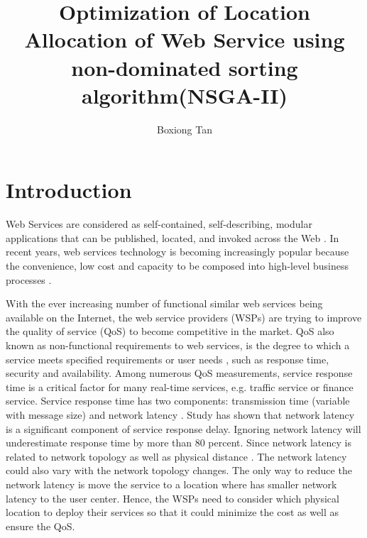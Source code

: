\documentclass[11pt, a4paper, oneside, openright]{article}
\title{Optimization of Location Allocation of Web Service using non-dominated sorting algorithm(NSGA-II)}
\author{Boxiong Tan}
\begin{document}
\frontmatter


\begin{abstract}
\end{abstract}


\maketitle




\mainmatter


\section{Introduction}
Web Services are considered as self-contained, self-describing, modular applications that can be published, located, and invoked across the Web \cite{Ran:2003:MWS:844357.844360}. 
In recent years, web services technology is becoming increasingly popular because the convenience, low cost and capacity to be composed into high-level business processes \cite{Aboolian200964}.


With the ever increasing number of functional similar web services being available on the Internet, the web service providers (WSPs) are trying to improve the quality of service (QoS) to become competitive in the market.  
QoS also known as non-functional requirements to  web services, is the degree to which a service meets specified requirements or user needs \cite{4061431}, such as response time, security and availability. 
Among numerous QoS measurements, service response time is a critical factor for many real-time services, e.g. traffic service or finance service. 
Service response time has two components: transmission time (variable with message size) and network latency \cite{Johansson:2000:INL:595252.595281}. 
Study \cite{Johansson:2000:INL:595252.595281, 916684} has shown that network latency is a significant component of service response delay.
Ignoring network latency will underestimate response time by more than 80 percent. Since network latency is related to network topology as well as physical distance \cite{distanceMetrics}. 
The network latency could also vary with the network topology changes.
The only way to reduce the network latency is move the service to a location where has smaller network latency to the user center. 
Hence, the WSPs need to consider which physical location to deploy their services so that it could minimize the cost as well as ensure the QoS.
\end{document}

